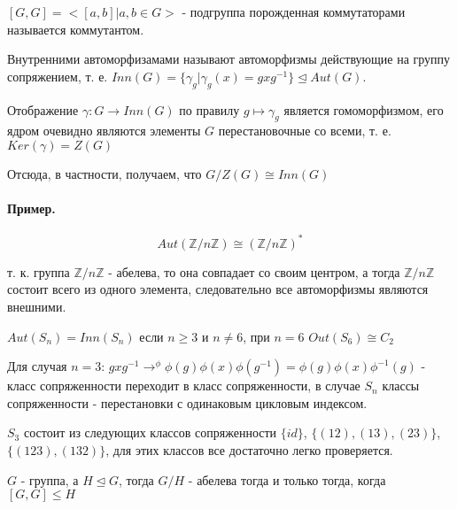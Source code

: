 \begin{Def}
$\left[G, G\right] = <\left[a, b\right] | a,b \in G>$ - подгруппа порожденная коммутаторами называется коммутантом.
\end{Def}

Внутренними автоморфизамами называют автоморфизмы действующие на группу сопряжением, т. е. $Inn\left(G\right) = \lbrace \gamma_g | \gamma_g \left(x\right) = g x g^{-1} \rbrace \trianglelefteq Aut\left(G\right)$.

Отображение $\gamma : G \rightarrow Inn\left(G\right)$ по правилу $g \mapsto \gamma_g$ является гомоморфизмом, его ядром очевидно являются элементы $G$ перестановочные со всеми, т. е. $Ker \left( \gamma \right) = Z\left(G\right)$

Отсюда, в частности, получаем, что $G/Z\left(G\right) \cong Inn\left(G\right)$

\paragraph{Пример.} 
\[
	Aut\left(\mathbb{Z} / {n \mathbb{Z}}\right) \cong \left(\mathbb{Z}/{n \mathbb{Z}}\right)^*
\]

т. к. группа $\mathbb{Z} / {n \mathbb{Z}}$ - абелева, то она совпадает со своим центром, а тогда $\mathbb{Z} / {n \mathbb{Z}}$ состоит всего из одного элемента, следовательно все автоморфизмы являются внешними.

\begin{Th}
$Aut\left(S_n\right) = Inn\left(S_n\right)$ если $n \ge 3$ и $n \not= 6$, при $n = 6$ $Out\left(S_6\right) \cong C_2$
\end{Th}

Для случая $n=3$: $g x g^{-1} \rightarrow^{\phi} \phi\left(g\right)\phi\left(x\right)\phi\left(g^{-1}\right) = \phi\left(g\right)\phi\left(x\right)\phi^{-1}\left(g\right)$  - класс сопряженности переходит в класс сопряженности, в случае $S_n$ классы сопряженности - перестановки с одинаковым цикловым индексом.

$S_3$ состоит из следующих классов сопряженности $\lbrace id \rbrace$, $\lbrace \left(1 2\right), \left(1 3\right), \left(2 3\right) \rbrace$, $\lbrace \left(1 2 3\right), \left(1 3 2\right)\rbrace$, для этих классов все достаточно легко проверяется.

\begin{Th}
$G$ - группа, а $H \trianglelefteq G$, тогда $G/H$ - абелева тогда и только тогда, когда $\left[G, G\right] \le H$
\end{Th}

